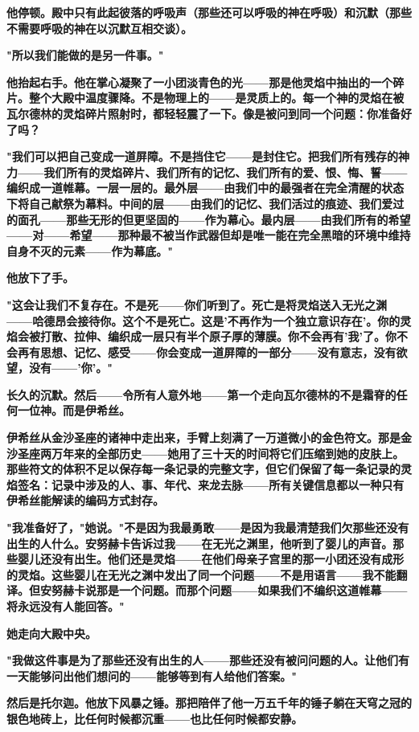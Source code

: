 \documentclass[12pt,a4paper,openany]{ctexbook}
\begin{document}
\textbf{他停顿。殿中只有此起彼落的呼吸声（那些还可以呼吸的神在呼吸）和沉默（那些不需要呼吸的神在以沉默互相交谈）。}


\textbf{"所以我们能做的是另一件事。"}


\textbf{他抬起右手。他在掌心凝聚了一小团淡青色的光——那是他灵焰中抽出的一个碎片。整个大殿中温度骤降。不是物理上的——是灵质上的。每一个神的灵焰在被瓦尔德林的灵焰碎片照射时，都轻轻震了一下。像是被问到同一个问题：你准备好了吗？}


\textbf{"我们可以把自己变成一道屏障。不是挡住它——是封住它。把我们所有残存的神力——我们所有的灵焰碎片、我们所有的记忆、我们所有的爱、恨、悔、誓——编织成一道帷幕。一层一层的。最外层——由我们中的最强者在完全清醒的状态下将自己献祭为幕料。中间的层——由我们的记忆、我们活过的痕迹、我们爱过的面孔——那些无形的但更坚固的——作为幕心。最内层——由我们所有的希望——对——希望——那种最不被当作武器但却是唯一能在完全黑暗的环境中维持自身不灭的元素——作为幕底。"}


\textbf{他放下了手。}


\textbf{"这会让我们不复存在。不是死——你们听到了。死亡是将灵焰送入无光之渊——哈德昂会接待你。这个不是死亡。这是'不再作为一个独立意识存在'。你的灵焰会被打散、拉伸、编织成一层只有半个原子厚的薄膜。你不会再有'我'了。你不会再有思想、记忆、感受——你会变成一道屏障的一部分——没有意志，没有欲望，没有——'你'。"}


\textbf{长久的沉默。然后——令所有人意外地——第一个走向瓦尔德林的不是霜脊的任何一位神。而是伊希丝。}


\textbf{伊希丝从金沙圣座的诸神中走出来，手臂上刻满了一万道微小的金色符文。那是金沙圣座两万年来的全部历史——她用了三十天的时间将它们压缩到她的皮肤上。那些符文的体积不足以保存每一条记录的完整文字，但它们保留了每一条记录的灵焰签名：记录中涉及的人、事、年代、来龙去脉——所有关键信息都以一种只有伊希丝能解读的编码方式封存。}


\textbf{"我准备好了，"她说。"不是因为我最勇敢——是因为我最清楚我们欠那些还没有出生的人什么。安努赫卡告诉过我——在无光之渊里，他听到了婴儿的声音。那些婴儿还没有出生。他们还是灵焰——在他们母亲子宫里的那一小团还没有成形的灵焰。这些婴儿在无光之渊中发出了同一个问题——不是用语言——我不能翻译。但安努赫卡说那是一个问题。而那个问题——如果我们不编织这道帷幕——将永远没有人能回答。"}


\textbf{她走向大殿中央。}


\textbf{"我做这件事是为了那些还没有出生的人——那些还没有被问问题的人。让他们有一天能够问出他们想问的——能够等到有人给他们答案。"}


\textbf{然后是托尔迦。他放下风暴之锤。那把陪伴了他一万五千年的锤子躺在天穹之冠的银色地砖上，比任何时候都沉重——也比任何时候都安静。}
\end{document}
